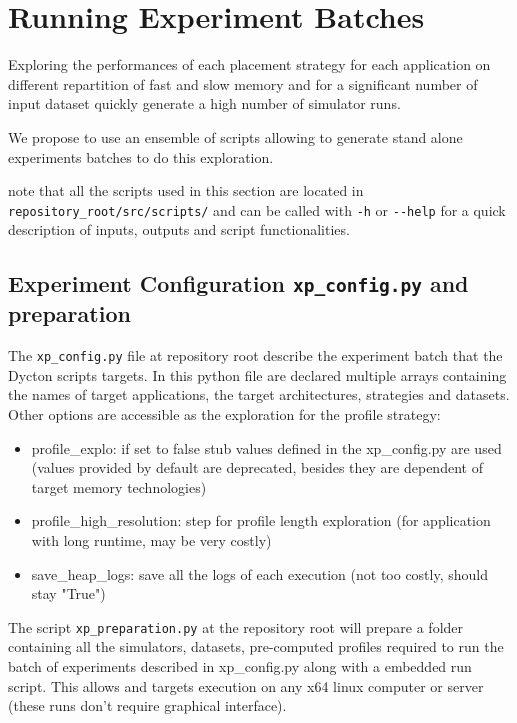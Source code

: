 \documentclass[10 pt]{article}
\begin{document}
\section{Running Experiment Batches}
Exploring the performances of each placement strategy for each application on different repartition of fast and slow memory and for a significant number of input dataset quickly generate a high number of simulator runs.

We propose to use an ensemble of scripts allowing to generate stand alone experiments batches to do this exploration.

note that all the scripts used in this section are located in \lstinline{repository_root/src/scripts/} and can be called with \lstinline{-h} or \lstinline{--help} for a quick description of inputs, outputs and script functionalities.

\subsection{Experiment Configuration \texttt{xp\_config.py} and preparation}
The \lstinline{xp_config.py} file at repository root describe the experiment batch that the Dycton scripts targets.
In this python file are declared multiple arrays containing the names of target applications, the target architectures, strategies and datasets.
Other options are accessible as the exploration for the profile strategy:
\begin{itemize}
  \item profile\_explo: if set to false stub values defined in the xp\_config.py are used (values provided by default are deprecated, besides they are dependent of target memory technologies)
  \item profile\_high\_resolution: step for profile length exploration (for application with long runtime, may be very costly)
  \item save\_heap\_logs: save all the logs of each execution (not too costly, should stay "True")
\end{itemize}


\bigskip
The script \lstinline{xp_preparation.py} at the repository root will prepare a folder containing all the simulators, datasets, pre-computed profiles required to run the batch of experiments described in xp\_config.py along with a embedded run script.
This allows and targets execution on any x64 linux computer or server (these runs don't require graphical interface).
\end{document}
